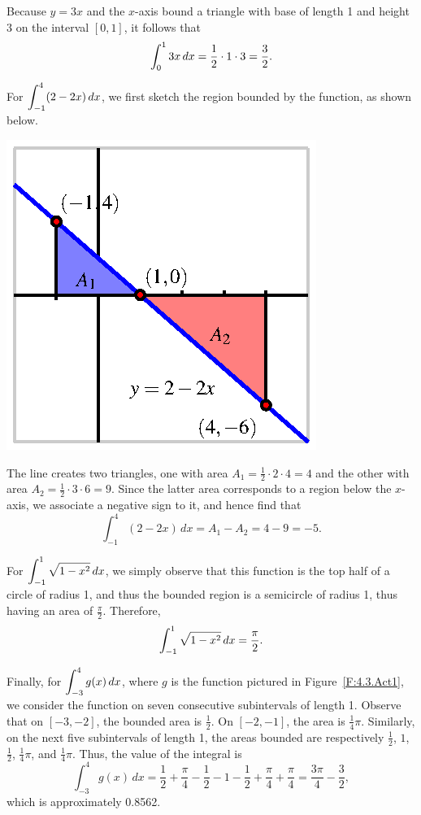 \begin{activitySolution}
\ba
	\item Because $y = 3x$ and the $x$-axis bound a triangle with base of length 1 and height $3$ on the interval $[0,1]$, it follows that 
	$$\displaystyle \int_0^1 3x \, dx = \frac{1}{2} \cdot 1 \cdot 3 = \frac{3}{2}.$$
	\item For $\displaystyle \int_{-1}^4 (2-2x) \, dx$, we first sketch the region bounded by the function, as shown below.
	\begin{center}
	\includegraphics{figures/4_3_Act1bSoln.eps}
	\end{center}
	The line creates two triangles, one with area $A_1 = \frac{1}{2} \cdot 2 \cdot 4 = 4$ and the other with area $A_2 = \frac{1}{2} \cdot 3 \cdot 6 = 9$.  Since the latter area corresponds to a region below the $x$-axis, we associate a negative sign to it, and hence find that
	$$\int_{-1}^4 (2-2x) \, dx = A_1 - A_2 = 4 - 9 = -5.$$
	\item For $\displaystyle \int_{-1}^1 \sqrt{1-x^2} \, dx$, we simply observe that this function is the top half of a circle of radius 1, and thus the bounded region is a semicircle of radius 1, thus having an area of $\frac{\pi}{2}$.  Therefore,
	$$\displaystyle \int_{-1}^1 \sqrt{1-x^2} \, dx = \frac{\pi}{2}.$$
	\item Finally, for $\displaystyle \int_{-3}^4 g(x) \, dx$, where $g$ is the function pictured in Figure~\ref{F:4.3.Act1}, we consider the function on seven consecutive subintervals of length 1.  Observe that on $[-3,-2]$, the bounded area is $\frac{1}{2}$.  On $[-2,-1]$, the area is $\frac{1}{4} \pi$.  Similarly, on the next five subintervals of length 1, the areas bounded are respectively $\frac{1}{2}$, $1$, $\frac{1}{2}$, $\frac{1}{4} \pi$, and $\frac{1}{4} \pi$.  Thus, the value of the integral is
	$$\int_{-3}^4 g(x) \, dx = \frac{1}{2} + \frac{\pi}{4} - \frac{1}{2} - 1 - \frac{1}{2} + \frac{\pi}{4} + \frac{\pi}{4} = \frac{3\pi}{4} - \frac{3}{2},$$
	which is approximately 0.8562.
\ea
\end{activitySolution}
\aftera